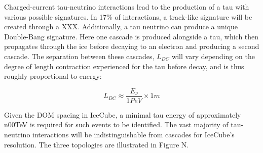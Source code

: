 Charged-current tau-neutrino interactions lead to the production of a tau with various possible signatures. In 17\% of interactions, a track-like signature will be created through a XXX. Additionally, a tau neutrino can produce a unique Double-Bang signature. Here one cascade is produced alongside a tau, which then propagates through the ice before decaying to an electron and producing a second cascade. The separation between these cascades, $L_{DC}$ will vary depending on the degree of length contraction experienced for the tau before decay, and is thus roughly proportional to energy:

\[L_{DC}  \approx \frac{E_{\nu}}{1 PeV} \times 1 m\]

Given the DOM spacing in IceCube, a minimal tau energy of approximately n00TeV is required for such events to be identified. The vast majority of tau-neutrino interactions will be indistinguishable from cascades for IceCube's resolution. The three topologies are illustrated in Figure N.